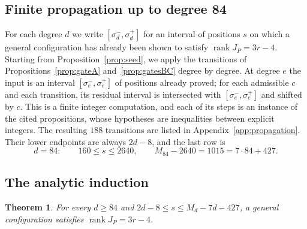 \documentclass{amsart}
\newtheorem{theorem}{Theorem}[section]
\theoremstyle{definition}
\theoremstyle{remark}
\numberwithin{equation}{section}
\DeclareMathOperator{\rank}{rank}
\begin{document}
\subsection{Finite propagation up to degree 84}
For each degree $d$ we write $[\sigma^-_d,\sigma^+_d]$ for an interval of positions $s$ on
which a general configuration has already been shown to satisfy $\rank J_P=3r-4$.
Starting from Proposition~\ref{prop:seed}, we apply the transitions of
Propositions~\ref{prop:gateA} and~\ref{prop:gatesBC} degree by degree. At degree $e$ the
input is an interval $[\sigma^-_e,\sigma^+_e]$ of positions already proved; for each admissible $c$ and
each transition, its residual interval is intersected with $[\sigma^-_e,\sigma^+_e]$ and shifted by $c$.
This is a finite integer computation, and each of its steps is an instance of the cited
propositions, whose hypotheses are inequalities between explicit integers. The resulting
$188$ transitions are listed in Appendix~\ref{app:propagation}. Their lower endpoints are
always $2d-8$, and the last row is
\begin{equation}\label{eq:row84}
  d=84:\qquad 160\le s\le2640,\qquad M_{84}-2640=1015=7\cdot84+427 .
\end{equation}

\subsection{The analytic induction}
\begin{theorem}\label{thm:broad}
For every $d\ge84$ and $2d-8\le s\le M_d-7d-427$, a general configuration satisfies
$\rank J_P=3r-4$.
\end{theorem}
\end{document}
